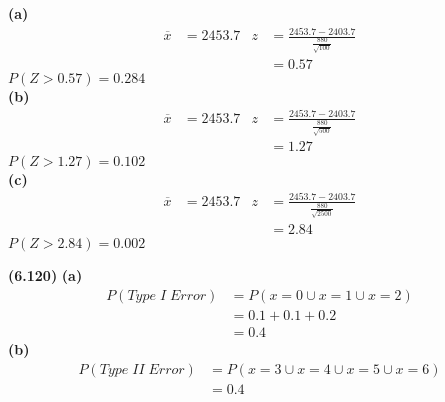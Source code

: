 \documentclass[11pt]{article}
\renewcommand\part[1]{\vspace{.10in}\textbf{(#1)}}
\begin{document}
		\part{a}
			\begin{align*}
				\overline{x} &= 2453.7 		&		z&=\frac{2453.7-2403.7}{\frac{880}{\sqrt{100}}} \\
						&			&		&= 0.57
			\end{align*}
			$P(Z>0.57)=0.284$\\
		\part{b}
			\begin{align*}
				\overline{x} &= 2453.7 		&		z&=\frac{2453.7-2403.7}{\frac{880}{\sqrt{500}}} \\
						&			&		&= 1.27
			\end{align*}
			$P(Z>1.27)=0.102$\\
		\part{c}
			\begin{align*}
				\overline{x} &= 2453.7 		&		z&=\frac{2453.7-2403.7}{\frac{880}{\sqrt{2500}}} \\
						&			&		&= 2.84
			\end{align*}
			$P(Z>2.84)=0.002$\par
	
	\part{6.120}
		\part{a}
			\begin{align*}
				P(Type\; I\; Error) &= P(x=0 \cup x = 1 \cup x = 2)\\
				&= 0.1 + 0.1 + 0.2\\
				&= 0.4	
			\end{align*}
		\part{b}
			\begin{align*}
				P(Type\; II\; Error) &= P(x=3 \cup x=4 \cup x=5 \cup x=6)\\
				&= 0.4
			\end{align*}\par
	
\end{document}

